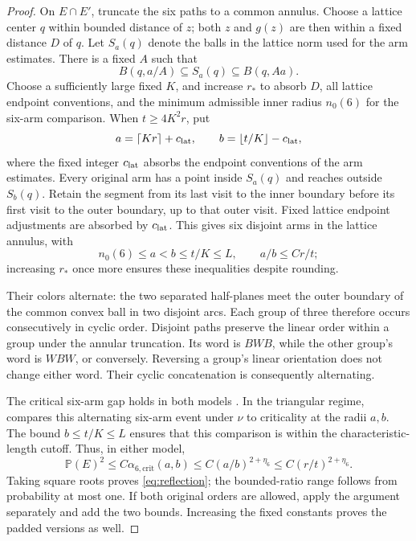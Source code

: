 \documentclass[11pt]{amsart}
\theoremstyle{remark}
\newcommand{\Prob}{\mathbb P}
\begin{document}
\begin{proof}
On $E\cap E'$, truncate the six paths to a common annulus. Choose a lattice
center $q$ within bounded distance of $z$; both $z$ and $g(z)$ are then
within a fixed distance $D$ of $q$. Let $S_a(q)$ denote the balls in the
lattice norm used for the arm estimates. There is a fixed $A$ such that
\[
 B(q,a/A)\subseteq S_a(q)\subseteq B(q,Aa).
\]
Choose a sufficiently large fixed $K$, and increase $r_*$ to absorb $D$,
all lattice endpoint conventions, and the minimum admissible inner radius
$n_0(6)$ for the six-arm comparison.
When $t\ge4K^2r$, put
\[
 a=\lceil Kr\rceil+c_{\rm lat},\qquad
 b=\lfloor t/K\rfloor-c_{\rm lat},
\]
where the fixed integer $c_{\rm lat}$ absorbs the endpoint conventions of
the arm estimates.
Every original arm has a point inside $S_a(q)$ and reaches outside
$S_b(q)$. Retain the segment from its last visit to the inner boundary
before its first visit to the outer boundary, up to that outer visit.
Fixed lattice endpoint adjustments are absorbed by $c_{\rm lat}$.
This gives six disjoint arms in the lattice annulus, with
\[
 n_0(6)\le a<b\le t/K\le L,
 \qquad a/b\le C r/t;
\]
increasing $r_*$ once more ensures these inequalities despite rounding.

Their colors alternate: the two separated half-planes meet the outer boundary
of the common convex ball in two disjoint arcs.  Each group of three therefore occurs
consecutively in cyclic order.  Disjoint paths preserve the linear order
within a group under the annular truncation.  Its word is $BWB$, while
the other group's word is $WBW$, or conversely.  Reversing a group's
linear orientation does not change either word.  Their cyclic
concatenation is consequently alternating.

The critical six-arm gap holds in both models
\cite[Remark~4.6]{GPS}.  In the triangular regime,
\cite[Theorem~27]{Nolin} compares this alternating six-arm event under
$\nu$ to criticality at the radii $a,b$. The bound $b\le t/K\le L$
ensures that this comparison is within the characteristic-length cutoff.
Thus, in either model,
\[
 \Prob(E)^2\le C\alpha_{6,\mathrm{crit}}(a,b)
 \le C(a/b)^{2+\eta_6}
 \le C(r/t)^{2+\eta_6}.
\]
Taking square roots proves \eqref{eq:reflection}; the bounded-ratio
range follows from probability at most one.  If both original orders
are allowed, apply the argument separately and add the two bounds.
Increasing the fixed constants proves the padded versions as well.
\end{proof}
\end{document}
